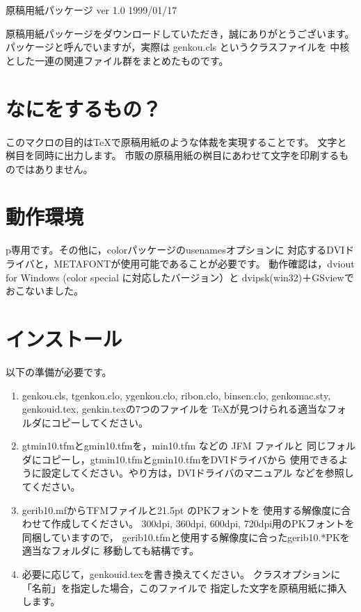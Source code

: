 \documentclass{jarticle}
\begin{document}
\begin{center}
{\LARGE 原稿用紙パッケージ\vskip5mm
ver 1.0\vskip5mm
\large 1999/01/17}\vskip10mm
\end{center}

原稿用紙パッケージをダウンロードしていただき，誠にありがとうございます。
パッケージと呼んでいますが，実際は genkou.cls というクラスファイルを
中核とした一連の関連ファイル群をまとめたものです。

\section{なにをするもの？}
このマクロの目的は\TeX{}で原稿用紙のような体裁を実現することです。
文字と桝目を同時に出力します。
市販の原稿用紙の桝目にあわせて文字を印刷するものではありません。

\section{動作環境}
p\LaTeXe{}専用です。その他に，colorパッケージのusenamesオプションに
対応するDVIドライバと，METAFONTが使用可能であることが必要です。
動作確認は，dviout for Windows (color special に対応したバージョン）と
dvipsk(win32)＋GSviewでおこないました。

\section{インストール}
以下の準備が必要です。

\begin{enumerate}
\item genkou.cls, tgenkou.clo, ygenkou.clo, ribon.clo, binsen.clo,
genkomac.sty, genkouid.tex, genkin.texの7つのファイルを
\TeX{}が見つけられる適当なフォルダにコピーしてください。
\item gtmin10.tfmとgmin10.tfmを，min10.tfm などの JFM ファイルと
同じフォルダにコピーし，gtmin10.tfmとgmin10.tfmをDVIドライバから
使用できるように設定してください。やり方は，DVIドライバのマニュアル
などを参照してください。
\item gerib10.mfからTFMファイルと21.5pt のPKフォントを
使用する解像度に合わせて作成してください。
300dpi, 360dpi, 600dpi, 720dpi用のPKフォントを同梱していますので，
gerib10.tfmと使用する解像度に合ったgerib10.*PKを適当なフォルダに
移動しても結構です。
\item 必要に応じて，genkouid.texを書き換えてください。
クラスオプションに「名前」を指定した場合，このファイルで
指定した文字を原稿用紙に挿入します。
\end{enumerate}
\end{document}
